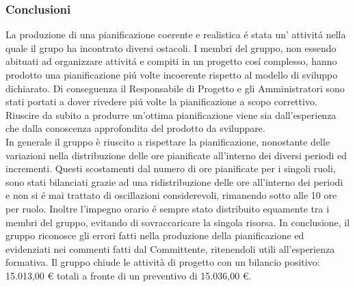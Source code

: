 \subsubsection{Conclusioni}
La produzione di una pianificazione coerente e realistica é stata un' attivitá nella quale il grupo ha incontrato diversi ostacoli. I membri del gruppo, non essendo abituati ad organizzare attivitá e compiti in un progetto cosí complesso, hanno prodotto una pianificazione piú volte incoerente rispetto al modello di sviluppo dichiarato. Di conseguenza il Responsabile di Progetto e gli Amministratori sono stati portati a dover rivedere piú volte la pianificazione a scopo correttivo. Riuscire da subito a produrre un'ottima pianificazione viene sia dall'esperienza che dalla conoscenza approfondita del prodotto da sviluppare.\\
In generale il gruppo è riuscito a rispettare la pianificazione, nonostante delle variazioni nella distribuzione delle ore pianificate all'interno dei diversi periodi ed incrementi. Questi scostamenti dal numero di ore pianificate per i singoli ruoli, sono stati bilanciati grazie ad una ridistribuzione delle ore all'interno dei periodi e non si é mai trattato di oscillazioni considerevoli, rimanendo sotto alle 10 ore per ruolo. Inoltre l'impegno orario é sempre stato distribuito equamente tra i membri del gruppo, evitando di sovraccaricare la singola risorsa.
\newline
\newline
In conclusione, il gruppo riconosce gli errori fatti nella produzione della pianificazione ed evidenziati nei commenti fatti dal Committente, ritenendoli utili all'esperienza formativa.
\newline
\newline
Il gruppo chiude le attività di progetto con un bilancio positivo: 15.013,00 \euro{} totali a fronte di un preventivo di 15.036,00 \euro{}.
